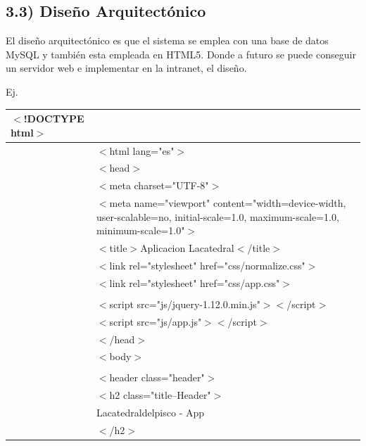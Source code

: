 \documentclass{article} %
\begin{document}
\subsection{3.3) Dise\~{n}o Arquitect\'{o}nico}

\noindent El dise\~{n}o arquitect\'{o}nico es que el sistema se emplea con una base de datos MySQL y tambi\'{e}n esta empleada en HTML5. Donde a futuro se puede conseguir un servidor web e implementar en la intranet, el dise\~{n}o.

\noindent Ej.

\begin{tabular}{|p{0.6in}|p{4.0in}|} \hline 
$\mathrm{<}$!DOCTYPE html$\mathrm{>}$ \\ \hline 
 & $\mathrm{<}$html lang="es"$\mathrm{>}$ \\ \hline 
 & $\mathrm{<}$head$\mathrm{>}$ \\ \hline 
 &  $\mathrm{<}$meta charset="UTF-8"$\mathrm{>}$ \\ \hline 
 &  $\mathrm{<}$meta name="viewport" content="width=device-width, user-scalable=no, initial-scale=1.0, maximum-scale=1.0, minimum-scale=1.0"$\mathrm{>}$ \\ \hline 
 &  $\mathrm{<}$title$\mathrm{>}$Aplicacion Lacatedral$\mathrm{<}$/title$\mathrm{>}$ \\ \hline 
 &  $\mathrm{<}$link rel="stylesheet" href="css/normalize.css"$\mathrm{>}$ \\ \hline 
 &  $\mathrm{<}$link rel="stylesheet" href="css/app.css"$\mathrm{>}$ \\ \hline 
 & \newline  \\ \hline 
 &  $\mathrm{<}$script src="js/jquery-1.12.0.min.js"$\mathrm{>}$$\mathrm{<}$/script$\mathrm{>}$ \\ \hline 
 &  $\mathrm{<}$script src="js/app.js"$\mathrm{>}$$\mathrm{<}$/script$\mathrm{>}$ \\ \hline 
 & $\mathrm{<}$/head$\mathrm{>}$ \\ \hline 
 & $\mathrm{<}$body$\mathrm{>}$ \\ \hline 
 & \newline  \\ \hline 
 &  $\mathrm{<}$header class="header"$\mathrm{>}$ \\ \hline 
 &   $\mathrm{<}$h2 class="title--Header"$\mathrm{>}$ \\ \hline 
 &    Lacatedraldelpisco - App \\ \hline 
 &   $\mathrm{<}$/h2$\mathrm{>}$ \\ \hline 

\end{tabular}
\end{document}
